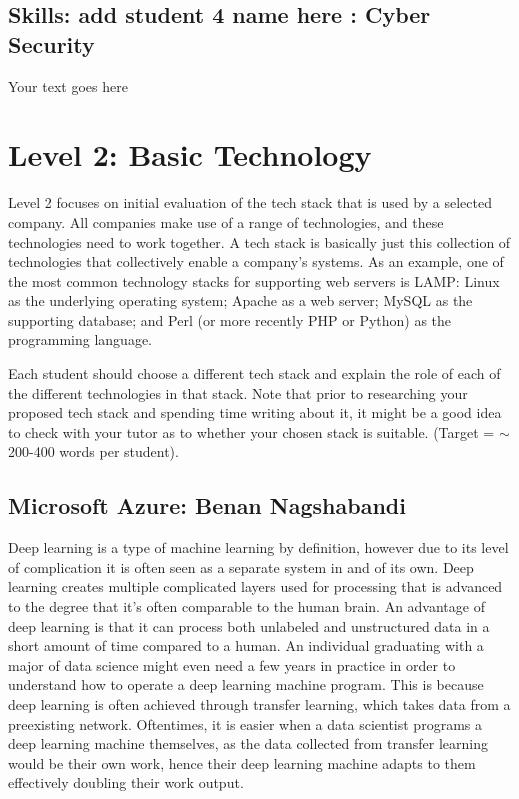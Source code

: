 \documentclass[a4paper, 11pt]{report}
\begin{document}
\subsection{Skills: add student 4 name here : Cyber Security}

Your text goes here



\newpage
\section{Level 2: Basic Technology}

Level 2 focuses on initial evaluation of the tech stack that is used by a selected company. All companies make use of a range of technologies, and these technologies need to work together. A tech stack is basically just this collection of technologies that collectively enable a company's systems. As an example, one of the most common technology stacks for supporting web servers is LAMP: Linux as the underlying operating system; Apache as a web server; MySQL as the supporting database; and Perl (or more recently PHP or Python) as the programming language.

Each student should choose a different tech stack and explain the role of each of the different technologies in that stack. Note that prior to researching your proposed tech stack and spending time writing about it, it might be a good idea to check with your tutor as to whether your chosen stack is suitable. (Target = $\sim$200-400 words per student).

\subsection{Microsoft Azure: Benan Nagshabandi}
\par Deep learning is a type of machine learning by definition, however due to its level of complication it is often seen as a separate system in and of its own. Deep learning creates multiple complicated layers used for processing that is advanced to the degree that it's often comparable to the human brain. An advantage of deep learning is that it can process both unlabeled and unstructured data in a short amount of time compared to a human. An individual graduating with a major of data science might even need a few years in practice in order to understand how to operate a deep learning machine program. This is because deep learning is often achieved through transfer learning, which takes data from a preexisting network. Oftentimes, it is easier when a data scientist programs a deep learning machine themselves, as the data collected from transfer learning would be their own work, hence their deep learning machine adapts to them effectively doubling their work output.
\end{document}
